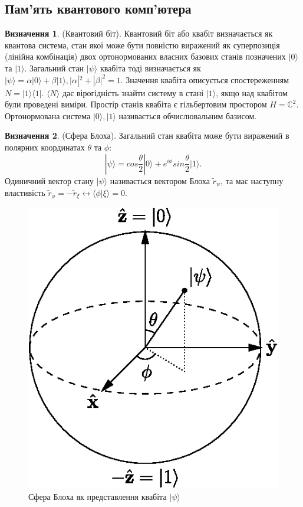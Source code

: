 \documentclass{article}
\theoremstyle{definition}
\newtheorem{definition}{Визначення}
\begin{document}
\newpage
\subsection{Пам'ять квантового комп'ютера}

\begin{definition} (Квантовий біт). Квантовий біт або квабіт визначається як квантова система,
стан якої може бути повністю виражений як суперпозиція (лінійна комбінація)
двох ортонормованих власних базових станів
позначених $|0\rangle$ та $|1\rangle$. Загальний стан $|\psi\rangle$ квабіта  тоді визначається
як $|\psi\rangle = \alpha |0\rangle + \beta |1\rangle, |\alpha|^2 + |\beta|^2 = 1$.
Значення квабіта описується спостереженням $N=|1\rangle\langle{1}|$. $\langle{N}\rangle$ дає
вірогідність знайти систему в стані $|1\rangle$, якщо над квабітом були проведені виміри.
Простір станів квабіта є гільбертовим простором $H=\mathbb{C}^2$.
Ортонормована система ${|0\rangle,|1\rangle}$ називається обчислювальним базисом.
\end{definition}

\begin{definition} (Сфера Блоха).
Загальний стан квабіта може бути виражений в полярних координатах $\theta$ та $\phi$:
$$
|\psi\rangle=cos\frac{\theta}{2}|0\rangle+e^{i\phi}sin\frac{\theta}{2}|1\rangle.
$$
Одиничний вектор стану $|\psi\rangle$ називається вектором Блоха $\tilde{r}_\psi$, та має
наступну властивість $\tilde{r}_\phi=-\tilde{r}_\xi \leftrightarrow \langle\phi|\xi\rangle = 0$.
\begin{figure}[h]
  \centerline{\includegraphics[scale=0.6]{bloch.eps}}
  \caption{Сфера Блоха як представлення квабіта $|\psi\rangle$}
\end{figure}
\end{definition}
\end{document}
